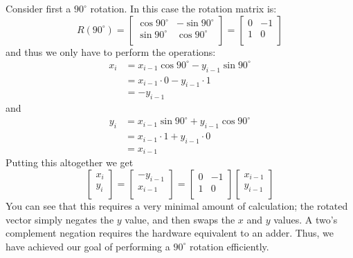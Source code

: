 Consider first a $90^\circ$ rotation. In this case the rotation matrix is:
\begin{equation}
R(90^\circ) = \begin{bmatrix}
\cos 90^\circ & -\sin 90^\circ \\
\sin 90^\circ & \cos 90^\circ \\
\end{bmatrix} = \begin{bmatrix}
0 & -1 \\
1 & 0 \\
\end{bmatrix} 
\end{equation} and thus we only have to perform the operations:
\begin{align}
x_i &= x_{i-1}  \cos 90^\circ - y_{i-1} \sin 90^\circ \nonumber \\
& = x_{i-1} \cdot 0 - y_{i-1} \cdot 1 \nonumber \\
& = -y_{i-1}\
\end{align}
and 
\begin{align}
y_i &= x_{i-1} \sin  90^\circ + y_{i-1} \cos 90^\circ \nonumber \\
& = x_{i-1} \cdot 1 + y_{i-1} \cdot 0 \nonumber \\
&=  x_{i-1}\
\end{align}
Putting this altogether we get
\begin{equation}
  \begin{bmatrix}
x_i \\
y_i \\
\end{bmatrix} 
=
\begin{bmatrix}
-y_{i-1} \\
x_{i-1} \\
\end{bmatrix} 
=
\begin{bmatrix}
0 & -1 \\
1 & 0 \\
\end{bmatrix}\begin{bmatrix}
x_{i-1} \\
y_{i-1} \\
\end{bmatrix}
\end{equation}
You can see that this requires a very minimal amount of calculation; the rotated vector simply negates the $y$ value, and then swaps the $x$ and $y$ values. A two's complement negation requires the hardware equivalent to an adder. Thus, we have achieved our goal of performing a $90^\circ$ rotation efficiently.

